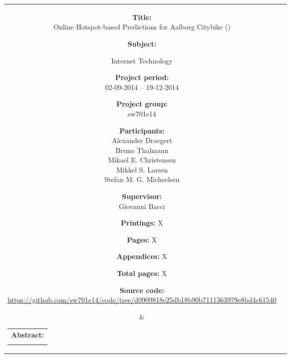 \begin{titlepage}
\begin{nopagebreak}
{\begin{tabular}{cc}
	\parbox{6cm}{
	\begin{description}
		\item { \textbf{Title:}}\\
			Online Hotspot-based Predictions for Aalborg Citybike (\projectname)
    		\item { \textbf{Subject:}}\\
			\raggedright Internet Technology
		\item { \textbf{Project period:}}\\
			02-09-2014 -- 19-12-2014
 		\hspace{4cm}
		\item { \textbf{Project group:}}\\
  			sw701e14
 		\hspace{4cm}
		\item {\textbf{Participants:}}\\
			Alexander Draegert\\
			Bruno Thalmann\\
			Mikael E. Christensen\\
			Mikkel S. Larsen\\
			Stefan M. G. Micheelsen
		\item { \textbf{Supervisor:}}\\
 			Giovanni Bacci
		\item { \textbf{Printings:} X }
		\item { \textbf{Pages:} X } 
		\item { \textbf{Appendices:} X }
		\item { \textbf{Total pages:} X }
		\item { \textbf{Source code:}\\ {\small \mbox{\footnotesize\url{https://github.com/sw701e14/code/tree/d0909818e25db18b90b7111363979e8bd4c61540}}}}
	\end{description}
	\vfill } &
	\parbox{8cm}{
  	\hfill 
  	\begin{tabular}{l}
  		{ \textbf{Abstract:}} \\
  		\fbox{
  		\parbox{8cm}{\smallskip
     		{\vfill{\footnotesize 
     		\smallskip}}}
     	}
   	\end{tabular}}
\end{tabular}
}%
\end{nopagebreak}
\end{titlepage}